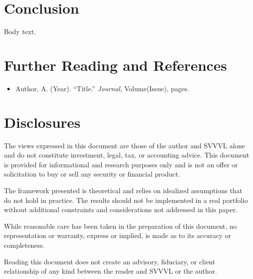 \documentclass[11pt]{article}
\begin{document}


\section{Conclusion}

Body text.

\newpage
\section{Further Reading and References}

\begin{itemize}\setlength{\itemsep}{0.4em}

  \item[{[1]}]\hypertarget{ref:1}{} Author, A. (Year). ``Title.''
    \textit{Journal}, Volume(Issue), pages.

\end{itemize}

\newpage
\section{Disclosures}

The views expressed in this document are those of the author and
SVVVL alone and do not constitute investment, legal, tax, or
accounting advice. This document is provided for informational and
research purposes only and is not an offer or solicitation to buy or
sell any security or financial product.

The framework presented is theoretical and relies on idealized
assumptions that do not hold in practice. The results
should not be implemented in a real portfolio without additional
constraints and considerations not addressed in this paper.

While reasonable care has been taken in the preparation of this
document, no representation or warranty, express or implied, is made
as to its accuracy or completeness.

Reading this document does not create an advisory, fiduciary, or
client relationship of any kind between the reader and SVVVL or the
author.
\end{document}
